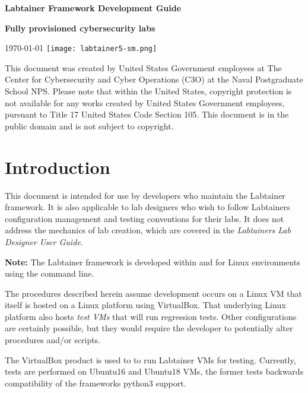\documentclass[12pt]{article}
\begin{document}
\begin{titlepage}
\centering
\vfill
\vspace*{4\baselineskip}
{\bfseries\Large
Labtainer Framework Development Guide\par
}
\vspace*{4\baselineskip}
{\bfseries
Fully provisioned cybersecurity labs\par
}
\vspace*{2\baselineskip}
\today
\vfill
\texttt{[image: labtainer5-sm.png]}
\vfill

\vspace{2.0in}
This document was created by United States Government employees at 
The Center for Cybersecurity and Cyber Operations (C3O) at the Naval Postgraduate School NPS. 
Please note that within the United States, copyright protection is not available for any works created  
by United States Government employees, pursuant to Title 17 United States Code Section 105.   
This document is in the public domain and is not subject to copyright. 
\end{titlepage}
\tableofcontents
\newpage
\section {Introduction}
This document is intended for use by developers who maintain the
Labtainer framework.  It is also applicable to lab designers who wish
to follow Labtainers configuration management and testing conventions for  their labs.
It does not address the mechanics of lab creation, which are 
covered in the \textit {Labtainers Lab Designer User Guide}.

\begin{flushleft} 
{\bf Note:} 
The Labtainer framework is developed within and for Linux environments using the command line.
\end{flushleft} 

The procedures described herein assume development occurs on a Linux VM that itself is hosted on
a Linux platform using VirtualBox.  That underlying Linux platform also hosts \textit{test VMs} that
will run regression tests.  Other configurations are certainly possible, but they would require the
developer to potentially alter procedures and/or scripts.

The VirtualBox product is used to to run Labtainer VMs for testing.  Currently, tests are performed on 
Ubuntu16 and Ubuntu18 VMs, the former tests backwards compatibility of the frameworks python3 support.
\end{document}
